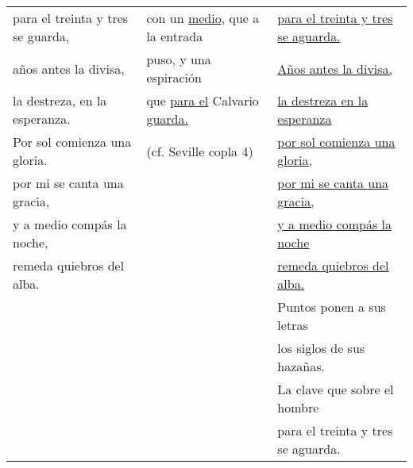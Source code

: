 \documentclass{vcfloat}
\newcommand{\strophe}{\hspace{1em}}
\begin{document}
\begin{tabular}{lll}
    para el treinta y tres se guarda,
    & con un \uline{medio}, que a la entrada &
    \uline{para el treinta y tres se aguarda.} \\

    años antes la divisa,
    & puso, y una espiración & 
    \strophe{} \uline{Años antes la divisa,} \\

    la destreza, en la esperanza.
    & que \uline{para el} Calvario \uline{guarda.} & 
    \uline{la destreza en la esperanza} \\

    \strophe{} Por sol comienza una gloria. & 
    (cf. Seville copla 4) & 
    \uline{por sol comienza una gloria,} \\

    por mi se canta una gracia, &
    &
    \uline{por mi se canta una gracia,} \\

    y a medio compás la noche, &
    &
    \uline{y a medio compás la noche} \\

    remeda quiebros del alba. &
    &
    \uline{remeda quiebros del alba.} \\
  
    & &
    \strophe{} Puntos ponen a sus letras \\
   
    & & 
    los siglos de sus hazañas. \\

    & & 
    La clave que sobre el hombre \\

    & & 
    para el treinta y tres se aguarda. \\
    \bottomrule
\end{tabular}
\end{document}

